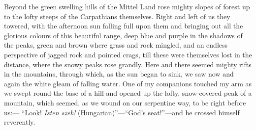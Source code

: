 \documentclass{article}
\begin{document}
				Beyond the green swelling hills of the Mittel Land rose mighty slopes of forest up to the lofty steeps of the Carpathians themselves. Right and left of us they towered, with the afternoon sun falling full upon them and bringing out all the glorious colours of this beautiful range, deep blue and purple in the shadows of the peaks, green and brown where grass and rock mingled, and an endless perspective of jagged rock and pointed crags, till these were themselves lost in the distance, where the snowy peaks rose grandly. Here and there seemed mighty rifts in the mountains, through which, as the sun began to sink, we saw now and again the white gleam of falling water. One of my companions touched my arm as we swept round the base of a hill and opened up the lofty, snow-covered peak of a mountain, which seemed, as we wound on our serpentine way, to be right before us:— “Look! \textit{Isten szek!} (Hungarian)”—“God’s seat!”—and he crossed himself reverently.\par\bigskip
				
\end{document}
